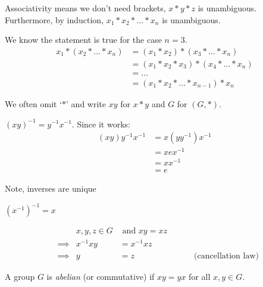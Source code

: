 \begin{remark}
Associativity means we don't need brackets, \(x * y * z\) is unambiguous.
Furthermore, by induction, \(x_1 * x_2 * \ldots * x_n\) is unambiguous.

We know the statement is true for the case \(n = 3\).
\begin{align*}
    x_1 * (x_2 * \ldots * x_n) &= (x_1 * x_2) * (x_3 * \ldots * x_n) \\
    &= (x_1 * x_2 * x_3) * (x_4 * \ldots * x_n) \\
    &= \ldots \\
    &= (x_1 * x_2 * \ldots * x_{n-1}) * x_n
\end{align*}
\end{remark}

\begin{remark}
We often omit `\(*\)' and write \(x y\) for \(x * y\) and \(G\) for \((G, *)\).
\end{remark}

\begin{remark}
\((xy)^{-1} = y^{-1} x^{-1}\). Since it works:
\begin{align*}
    (xy)y^{-1}x^{-1} &= x(y y^{-1})x^{-1} \\
    &= x e x^{-1} \\
    &= x x^{-1} \\
    &= e
\end{align*}
\end{remark}
Note, inverses are unique

\begin{remark}
\((x^{-1})^{-1} = x\)
\end{remark}

\begin{remark} \label{rem:cancellation-law}
\begin{align*} 
    && x, y, z \in G &\text{ and } xy = xz \\
    &\implies & x^{-1} x y &= x^{-1} x z \\
    &\implies & y &= z \hspace{3cm} \text{(cancellation law)}
\end{align*}
\end{remark}


\begin{definition}
A group \(G\) is \emph{abelian} (or commutative) if \(xy = yx\) for all \(x, y \in G\).
\end{definition}

